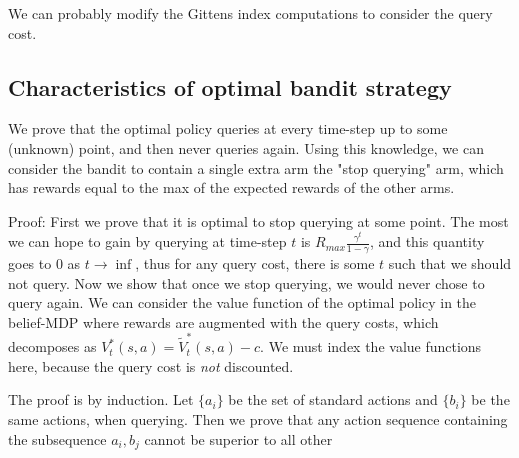 \documentclass{article}
\begin{document}
We can probably modify the Gittens index computations to consider the query cost.

\subsection{Characteristics of optimal bandit strategy}
We prove that the optimal policy queries at every time-step up to some (unknown) point, and then never queries again.
Using this knowledge, we can consider the bandit to contain a single extra arm the "stop querying" arm, which has rewards equal to the max of the expected rewards of the other arms.

Proof: 
First we prove that it is optimal to stop querying at some point.
The most we can hope to gain by querying at time-step $t$ is $R_{max} \frac{\gamma^t}{1 - \gamma}$, and this quantity goes to 0 as $t \rightarrow \inf$, thus for any query cost, there is some $t$ such that we should not query.
%
Now we show that once we stop querying, we would never chose to query again.  
We can consider the value function of the optimal policy in the belief-MDP where rewards are augmented with the query costs, which decomposes as
$V_t^*(s,a) = \tilde{V}_t^*(s,a) - c$. %
We must index the value functions here, because the query cost is \emph{not} discounted.

The proof is by induction.
Let $\{a_i\}$ be the set of standard actions and $\{b_i\}$ be the same actions, when querying.
Then we prove that any action sequence containing the subsequence $a_i, b_j$ cannot be superior to all other 












%

\end{document}
